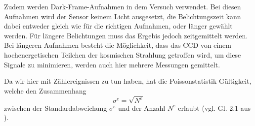 Zudem werden Dark-Frame-Aufnahmen in dem Versuch verwendet. Bei diesen Aufnahmen wird der Sensor keinem Licht ausgesetzt, die Belichtungszeit kann dabei entweder gleich wie für die richtigen Aufnahmen, oder länger gewählt werden. Für längere Belichtungen muss das Ergebis jedoch zeitgemittelt werden. Bei längeren Aufnahmen besteht die Möglichkeit, dass das CCD von einem hochenergetischen Teilchen der kosmischen Strahlung getroffen wird, um diese Signale zu minimieren, werden auch hier mehrere Messungen gemittelt. 

Da wir hier mit Zählereignissen zu tun haben, hat die Poissonstatistik Gültigkeit, welche den Zusammenhang 
$$\sigma^e=\sqrt{N^e}$$ 
zwischen der Standardabweichung $\sigma^e$ und der Anzahl $N^e$ erlaubt (vgl. Gl. 2.1 aus \autocite{ccd} ).


